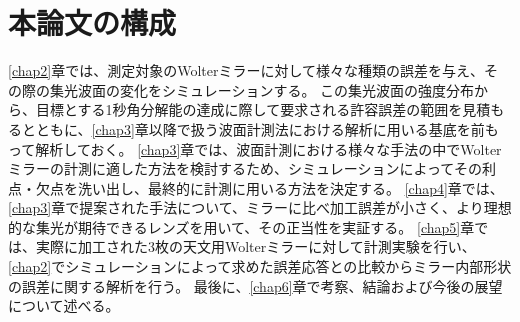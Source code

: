\section{本論文の構成}
\label{chap1_outline}

\ref{chap2}章では、測定対象のWolterミラーに対して様々な種類の誤差を与え、その際の集光波面の変化をシミュレーションする。
この集光波面の強度分布から、目標とする1秒角分解能の達成に際して要求される許容誤差の範囲を見積もるとともに、\ref{chap3}章以降で扱う波面計測法における解析に用いる基底を前もって解析しておく。
\ref{chap3}章では、波面計測における様々な手法の中でWolterミラーの計測に適した方法を検討するため、シミュレーションによってその利点・欠点を洗い出し、最終的に計測に用いる方法を決定する。
\ref{chap4}章では、\ref{chap3}章で提案された手法について、ミラーに比べ加工誤差が小さく、より理想的な集光が期待できるレンズを用いて、その正当性を実証する。
\ref{chap5}章では、実際に加工された3枚の天文用Wolterミラーに対して計測実験を行い、\ref{chap2}でシミュレーションによって求めた誤差応答との比較からミラー内部形状の誤差に関する解析を行う。
最後に、\ref{chap6}章で考察、結論および今後の展望について述べる。

